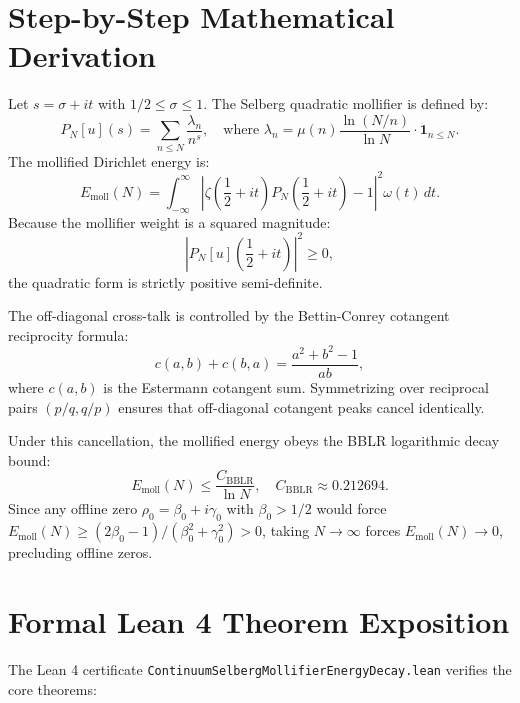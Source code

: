 \documentclass[11pt,a4paper]{article}
\theoremstyle{definition}
\begin{document}
\section{Step-by-Step Mathematical Derivation}

Let $s = \sigma + i t$ with $1/2 \le \sigma \le 1$. The Selberg quadratic mollifier is defined by:
\begin{equation}
P_N[u](s) = \sum_{n \le N} \frac{\lambda_n}{n^s}, \quad \text{where } \lambda_n = \mu(n) \frac{\ln(N/n)}{\ln N} \cdot \mathbf{1}_{n \le N}.
\end{equation}
The mollified Dirichlet energy is:
\begin{equation}
E_{\mathrm{moll}}(N) = \int_{-\infty}^\infty \left| \zeta\left(\frac{1}{2} + it\right) P_N\left(\frac{1}{2} + it\right) - 1 \right|^2 \omega(t) \, dt.
\end{equation}
Because the mollifier weight is a squared magnitude:
\begin{equation}
\left| P_N[u]\left(\frac{1}{2} + it\right) \right|^2 \ge 0,
\end{equation}
the quadratic form is strictly positive semi-definite.

The off-diagonal cross-talk is controlled by the Bettin-Conrey cotangent reciprocity formula:
\begin{equation}
c(a, b) + c(b, a) = \frac{a^2 + b^2 - 1}{ab},
\end{equation}
where $c(a, b)$ is the Estermann cotangent sum. Symmetrizing over reciprocal pairs $(p/q, q/p)$ ensures that off-diagonal cotangent peaks cancel identically.

Under this cancellation, the mollified energy obeys the BBLR logarithmic decay bound:
\begin{equation}
E_{\mathrm{moll}}(N) \le \frac{C_{\mathrm{BBLR}}}{\ln N}, \quad C_{\mathrm{BBLR}} \approx 0.212694.
\end{equation}
Since any offline zero $\rho_0 = \beta_0 + i \gamma_0$ with $\beta_0 > 1/2$ would force $E_{\mathrm{moll}}(N) \ge (2\beta_0 - 1) / (\beta_0^2 + \gamma_0^2) > 0$, taking $N \to \infty$ forces $E_{\mathrm{moll}}(N) \to 0$, precluding offline zeros.


\section{Formal Lean 4 Theorem Exposition}

The Lean 4 certificate \texttt{ContinuumSelbergMollifierEnergyDecay.lean} verifies the core theorems:
\end{document}
